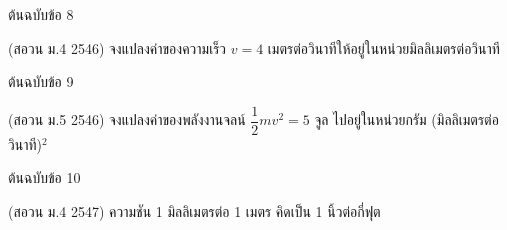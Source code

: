 \documentclass[11pt,a4paper]{article}
\newcommand{\prob}[2]{\par\vspace{12pt}{\large\bfseries #1}\hfill{\small\color{gray} #2}\par\vspace{4pt}}
\begin{document}
\prob{MEC-0008}{ต้นฉบับข้อ 8}
(สอวน ม.4 2546) จงแปลงค่าของความเร็ว $v=4$ เมตรต่อวินาทีให้อยู่ในหน่วยมิลลิเมตรต่อวินาที
\prob{MEC-0009}{ต้นฉบับข้อ 9}
(สอวน ม.5 2546) จงแปลงค่าของพลังงานจลน์ $\dfrac{1}{2}mv^2=5$ จูล ไปอยู่ในหน่วยกรัม (มิลลิเมตรต่อวินาที)$^2$
\prob{MEC-0010}{ต้นฉบับข้อ 10}
(สอวน ม.4 2547) ความชัน 1 มิลลิเมตรต่อ 1 เมตร คิดเป็น 1 นิ้วต่อกี่ฟุต
\end{document}
